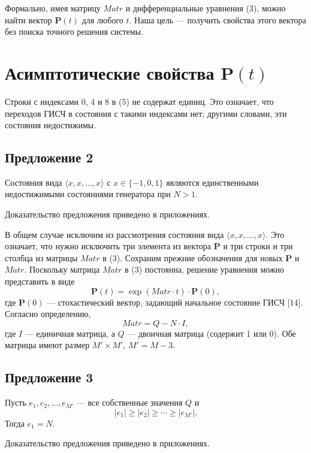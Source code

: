 \documentclass[a4paper,12pt]{article}
\begin{document}
Формально, имея матрицу $Matr$ и дифференциальные уравнения (3), можно найти вектор $\mathbf{P}(t)$ для любого $t$. Наша цель — получить свойства этого вектора без поиска точного решения системы.

\section{Асимптотические свойства $\mathbf{P}(t)$}

Строки с индексами 0, 4 и 8 в (5) не содержат единиц. Это означает, что переходов ГИСЧ в состояния с такими индексами нет; другими словами, эти состояния недостижимы.

\subsection*{Предложение 2}
Состояния вида $\langle x, x, \ldots, x \rangle$ с $x \in \{-1,0,1\}$ являются единственными недостижимыми состояниями генератора при $N > 1$.

Доказательство предложения приведено в приложениях.

В общем случае исключим из рассмотрения состояния вида $\langle x, x, \ldots, x \rangle$. Это означает, что нужно исключить три элемента из вектора $\mathbf{P}$ и три строки и три столбца из матрицы $Matr$ в (3). Сохраним прежние обозначения для новых $\mathbf{P}$ и $Matr$. Поскольку матрица $Matr$ в (3) постоянна, решение уравнения можно представить в виде
\begin{equation}
\mathbf{P}(t) = \exp(Matr \cdot t) \cdot \mathbf{P}(0), \tag{6}
\end{equation}
где $\mathbf{P}(0)$ — стохастический вектор, задающий начальное состояние ГИСЧ [14]. Согласно определению,
\begin{equation}
Matr = Q - N \cdot I, \tag{7}
\end{equation}
где $I$ — единичная матрица, а $Q$ — двоичная матрица (содержит 1 или 0). Обе матрицы имеют размер $M' \times M'$, $M' = M - 3$.

\subsection*{Предложение 3}
Пусть $e_1, e_2, \ldots, e_{M'}$ — все собственные значения $Q$ и
\begin{equation}
|e_1| \geq |e_2| \geq \cdots \geq |e_{M'}|. \tag{8}
\end{equation}
Тогда $e_1 = N$.

Доказательство предложения приведено в приложениях.
\end{document}
